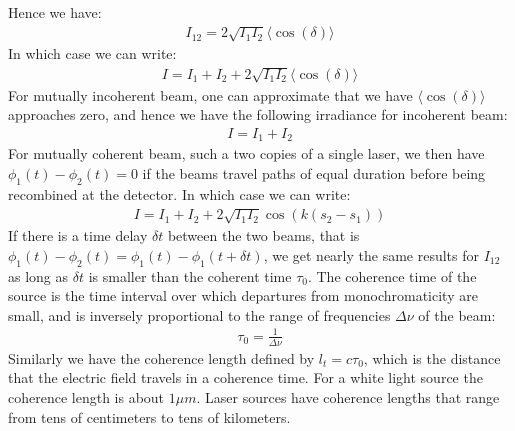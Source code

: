 \documentclass[11pt]{book}
\theoremstyle{break}
\theoremstyle{break}
\begin{document}
Hence we have:
\begin{align*}
I_{12} = 2\sqrt{I_1I_2}\langle\cos(\delta) \rangle
\end{align*}
In which case we can write:
\begin{align}
I = I_1 + I_2 + 2\sqrt{I_1I_2}\langle \cos(\delta) \rangle
\end{align}
For mutually incoherent beam, one can approximate that we have $\langle \cos(\delta) \rangle$ approaches zero, and hence we have the following irradiance for incoherent beam:
\begin{align*}
I = I_1 + I_2 \tag{incoherent beam}
\end{align*}
For mutually coherent beam, such a two copies of a single laser, we then have $\phi_1(t) - \phi_2(t) = 0$ if the beams travel paths of equal duration before being recombined at the detector. In which case we can write:
\begin{align*}
I = I_1+I_2+ 2\sqrt{I_1I_2} \cos(k(s_2 - s_1)) \tag{coherent beam}
\end{align*}
If there is a time delay $\delta t$ between the two beams, that is $\phi_1(t) - \phi_2(t) = \phi_1(t) - \phi_1(t+\delta t) $, we get nearly the same results for $I_{12}$ as long as $\delta t$ is smaller than the coherent time $\tau_0$. The coherence time of the source is the time interval over which departures from monochromaticity are small, and is inversely proportional to the range of frequencies $\Delta \nu$ of the beam:
\begin{align*}
\tau_0 = \frac{1}{\Delta \nu}
\end{align*}
Similarly we have the coherence length defined by $l_t = c\tau_0$, which is the distance that the electric field travels in a coherence time. For a white
light source the coherence length is about $1\mu m$. Laser sources have coherence lengths that range from tens of centimeters to tens of kilometers.\\
\end{document}
